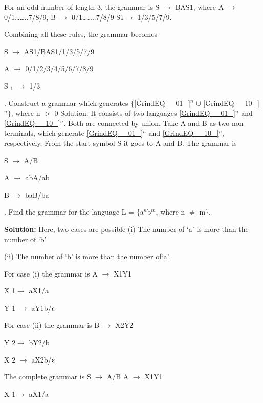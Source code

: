 \documentclass{article} %
\begin{document}
\noindent For an odd number of length 3, the grammar is S $\mathrm{\to}$ BAS1, where A $\mathrm{\to}$ 0/1{\dots}{\dots}..7/8/9, B $\mathrm{\to}$ 0/1{\dots}{\dots}..7/8/9 S1$\mathrm{\to}$ 1/3/5/7/9.

\noindent Combining all these rules, the grammar becomes

\noindent S $\mathrm{\to}$ AS1/BAS1/1/3/5/7/9

\noindent  A $\mathrm{\to}$ 0/1/2/3/4/5/6/7/8/9 

\noindent S ${}_{1}$ $\mathrm{\to}$ 1/3

. Construct a grammar which generates $\mathrm{\{}$\eqref{GrindEQ__01_}${}^{n}$ $\mathrm{\cup }$ \eqref{GrindEQ__10_}${}^{n}$$\mathrm{\}}$, where n $\mathrm{>}$ 0 Solution: It consists of two languages \eqref{GrindEQ__01_}${}^{n}$ and \eqref{GrindEQ__10_}${}^{n}$. Both are connected by union. Take A and B as two non-terminals, which generate \eqref{GrindEQ__01_}${}^{n}$ and \eqref{GrindEQ__10_}${}^{n}$, respectively. From the start symbol S it goes to A and B. The grammar is

\noindent S $\mathrm{\to}$ A/B

\noindent A $\mathrm{\to}$ abA/ab

\noindent  B $\mathrm{\to}$ baB/ba

. Find the grammar for the language L = $\mathrm{\{}$a${}^{n}$b${}^{m}$, where n $\mathrm{\neq}$ m$\mathrm{\}}$. 

\noindent \textbf{Solution:} Here, two cases are possible (i) The number of `a' is more than the number of `b' 

\noindent (ii) The number of `b' is more than the number of`a'.

\noindent For case (i) the grammar is                                A $\mathrm{\to}$ X1Y1 

\noindent X 1$\mathrm{\to}$ aX1/a 

\noindent Y 1 $\mathrm{\to}$ aY1b/$\varepsilonup$

\noindent  For case (ii) the grammar is                             B $\mathrm{\to}$ X2Y2 

\noindent Y 2$\mathrm{\to}$ bY2/b 

\noindent X 2 $\mathrm{\to}$ aX2b/$\varepsilonup$

\noindent The complete grammar is                                 S $\mathrm{\to}$ A/B A $\mathrm{\to}$ X1Y1

\noindent X 1$\mathrm{\to}$ aX1/a 
\end{document}
